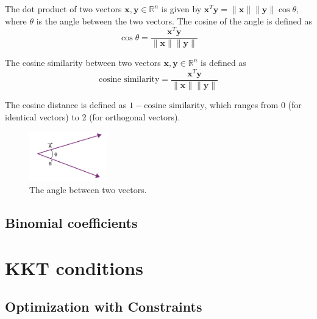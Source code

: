 \documentclass[11pt]{book} %
\begin{document}
The dot product of two vectors $\mathbf{x}, \mathbf{y} \in \mathbb{R}^n$ is given by $\mathbf{x}^T \mathbf{y} = \lVert \mathbf{x} \rVert \lVert \mathbf{y} \rVert \cos \theta$, 
where $\theta$ is the angle between the two vectors. The cosine of the angle is defined as \\
\begin{equation}
    \cos \theta = \frac{\mathbf{x}^T \mathbf{y}}{\lVert \mathbf{x} \rVert \lVert \mathbf{y} \rVert}
\end{equation}

The cosine similarity between two vectors $\mathbf{x}, \mathbf{y} \in \mathbb{R}^n$ is defined as \\
\begin{equation}
    \text{cosine similarity} = \frac{\mathbf{x}^T \mathbf{y}}{\lVert \mathbf{x} \rVert \lVert \mathbf{y} \rVert}
\end{equation}

The cosine distance is defined as $1 - \text{cosine similarity}$, which ranges from 0 (for identical vectors) to 2 (for orthogonal vectors).

\begin{figure}[h]
    \centering
    \includegraphics[width=0.3\textwidth]{Figs/angle_between_vectors.png}
    \caption{The angle between two vectors.}
    \label{fig:cosine_similarity}
\end{figure}

\subsection{Binomial coefficients}

%
%
%

\section{KKT conditions}
\subsection{Optimization with Constraints}
\end{document}
